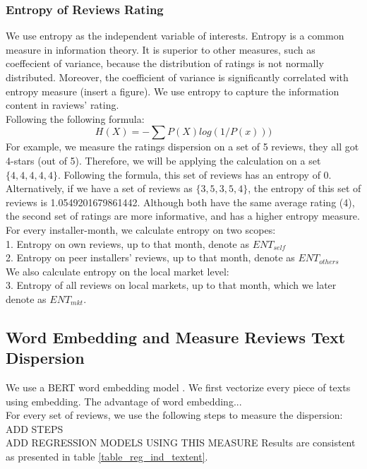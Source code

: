 \documentclass[msom,blindrev]{informs3}
\begin{document}
\subsubsection{Entropy of Reviews Rating}
We use entropy as the independent variable of interests. Entropy is a common measure in information theory. It is superior to other measures, such as coeffecient of variance, because the distribution of ratings is not normally distributed. Moreover, the coefficient of variance is significantly correlated with entropy measure (insert a figure). We use entropy to capture the information content in raviews' rating. \\ 
Following the following formula:  \\ 
\begin{equation}
H(X)=-\sum P(X)log(1/P(x)))
\end{equation}
For example, we measure the ratings dispersion on a set of 5 reviews, they all got 4-stars (out of 5). Therefore, we will be applying the calculation on a set $\{4,4,4,4,4\}$. Following the formula, this set of reviews has an entropy of 0. Alternatively, if we have a set of reviews as $\{3,5,3,5,4\}$, the entropy of this set of reviews is 1.0549201679861442. Although both have the same average rating (4), the second set of ratings are more informative, and has a higher entropy measure. \\

For every installer-month, we calculate entropy on two scopes: \\
1. Entropy on own reviews, up to that month, denote as $ENT_{self}$ \\ 
2. Entropy on peer installers' reviews, up to that month, denote as $ENT_{others}$ \\
We also calculate entropy on the local market level:\\
3. Entropy of all reviews on local markets, up to that month, which we later denote as $ENT_{mkt}$. 
\subsection{Word Embedding and Measure Reviews Text Dispersion}
We use a BERT word embedding model \citep{devlin2018bert}. We first vectorize every piece of texts using embedding. The advantage of word embedding... \\
For every set of reviews, we use the following steps to measure the dispersion: ADD STEPS \\
ADD REGRESSION MODELS USING THIS MEASURE 
Results are consistent as presented in table \ref{table_reg_ind_textent}. 
\end{document}
